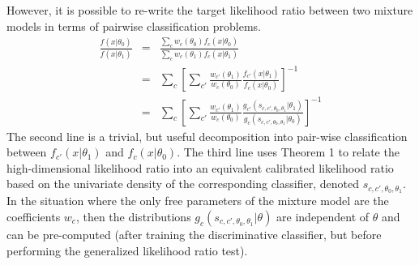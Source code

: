 \documentclass[11pt, oneside]{article}   	%
\begin{document}
However, it is possible to re-write the target likelihood ratio between two mixture models in terms of pairwise classification problems. 
\begin{eqnarray}
\frac{f(x|\theta_0)}{f(x|\theta_1)} & =& \frac{\sum_c w_c(\theta_0) f_c(x| \theta_0)}{\sum_c w_c(\theta_1) f_c(x| \theta_1)} 
\\
&=& \sum_c \left[ \sum_{c'} \frac{ w_{c'}(\theta_1)}{w_c(\theta_0)} \frac{ f_{c'}(x| \theta_1)}{  f_c(x| \theta_0)}  \right]^{-1} \\
&=& \sum_c \left[ \sum_{c'} \frac{ w_{c'}(\theta_1)}{w_c(\theta_0)} \frac{ g_{c'}(s_{c,c',\theta_0, \theta_1}| \theta_1)}{ g_c(s_{c,c',\theta_0, \theta_1}| \theta_0)}  \right]^{-1} 
\end{eqnarray}
The second line is a trivial, but useful decomposition into pair-wise classification between $f_{c'}(x|\theta_1)$ and $f_c(x|\theta_0)$.  The third line uses Theorem 1 to relate the high-dimensional likelihood ratio into an equivalent calibrated likelihood ratio based on the univariate density of the corresponding classifier, denoted $s_{c,c',\theta_0, \theta_1}$. In the situation where the only free parameters of the mixture model are the coefficients $w_c$, then the distributions $g_{c}(s_{c,c',\theta_0, \theta_1}| \theta)$ are independent of $\theta$ and can be pre-computed (after training the discriminative classifier, but before performing the generalized likelihood ratio test).


%
\end{document}
